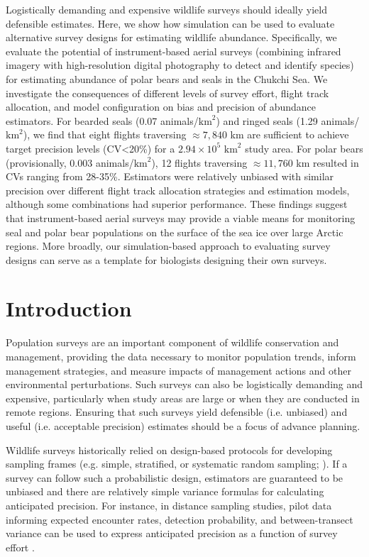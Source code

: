 \documentclass[]{rsos}%
\begin{document}
Logistically demanding and expensive wildlife surveys should ideally yield defensible estimates. Here, we show how simulation can be used to evaluate alternative survey designs for estimating wildlife abundance. Specifically, we evaluate the potential of instrument-based aerial surveys (combining infrared imagery with high-resolution digital photography to detect and identify species) for estimating abundance of polar bears and seals in the Chukchi Sea. We investigate the consequences of different levels of survey effort, flight track allocation, and model configuration on bias and precision of abundance estimators. For bearded seals (0.07 animals/$\text{km}^2$) and ringed seals (1.29 animals/$\text{km}^2$), we find that eight flights traversing $\approx 7,840$ km are sufficient to achieve target precision levels (CV<20\%) for a $2.94 \times 10^5$ $\text{km}^2$ study area.  For polar bears (provisionally, 0.003 animals/$\text{km}^2$), 12 flights traversing $\approx 11,760$ km resulted in CVs ranging from 28-35\%. Estimators were relatively unbiased with similar precision over different flight track allocation strategies and estimation models, although some combinations had superior performance.  These findings suggest that instrument-based aerial surveys may provide a viable means for monitoring seal and polar bear populations on the surface of the sea ice over large Arctic regions.  More broadly, our simulation-based approach to evaluating survey designs can serve as a template for biologists designing their own surveys.

\section{Introduction}

Population surveys are an important component of wildlife conservation and management,  providing the data necessary to monitor population trends, inform management strategies, and measure impacts of management actions and other environmental perturbations. Such surveys can also be logistically demanding and expensive, particularly when study areas are large or when they are conducted in remote regions.  Ensuring that such surveys yield defensible (i.e. unbiased) and useful (i.e. acceptable precision) estimates should be a focus of advance planning.

Wildlife surveys historically relied on design-based protocols for developing sampling frames (e.g. simple, stratified, or systematic random sampling; \cite{Cochran1977}).  If a survey can follow such a probabilistic design, estimators are guaranteed to be unbiased and there are relatively simple variance formulas for calculating anticipated precision.  For instance, in distance sampling studies, pilot data informing expected encounter rates, detection probability, and between-transect variance can be used to express anticipated precision as a function of survey effort \cite{BucklandEtAl2001}.
\end{document}
